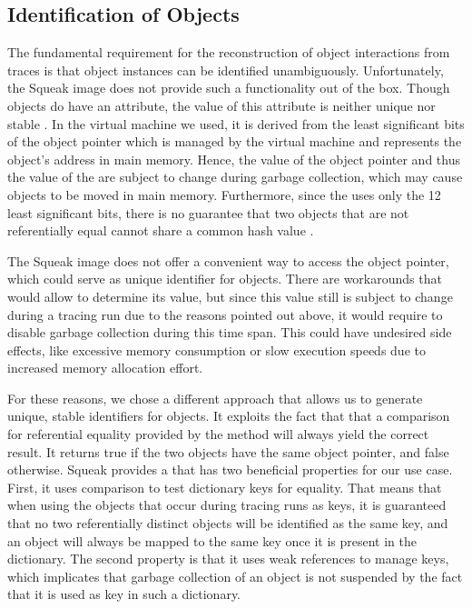 \subsection{Identification of Objects}
\label{ss:ImplementationTracingIdentification}
The fundamental requirement for the reconstruction of object interactions from traces is that object instances can be identified unambiguously.
Unfortunately, the Squeak image does not provide such a functionality out of the box.
Though objects do have an  attribute, the value of this attribute is neither unique nor stable \cite{goldberg_smalltalk-80:_1983}.
In the virtual machine we used, it is derived from the least significant bits of the object pointer which is managed by the virtual machine and represents the object's address in main memory.
Hence, the value of the object pointer and thus the value of the  are subject to change during garbage collection, which may cause objects to be moved in main memory.
Furthermore, since the  uses only the 12 least significant bits, there is no guarantee that two objects that are not referentially equal cannot share a common hash value \cite{goldberg_smalltalk-80:_1983}.

The Squeak image does not offer a convenient way to access the object pointer, which could serve as unique identifier for objects.
There are workarounds that would allow to determine its value, but since this value still is subject to change during a tracing run due to the reasons pointed out above, it would require to disable garbage collection during this time span.
This could have undesired side effects, like excessive memory consumption or slow execution speeds due to increased memory allocation effort.

For these reasons, we chose a different approach that allows us to generate unique, stable identifiers for objects.
It exploits the fact that that a comparison for referential equality provided by the \inlinecode{==} method will always yield the correct result.
It returns true if the two objects have the same object pointer, and false otherwise.
Squeak provides a  that has two beneficial properties for our use case.
First, it uses \inlinecode{==} comparison to test dictionary keys for equality.
That means that when using the objects that occur during tracing runs as keys, it is guaranteed that no two referentially distinct objects will be identified as the same key, and an object will always be mapped to the same key once it is present in the dictionary.
The second property is that it uses weak references to manage keys, which implicates that garbage collection of an object is not suspended by the fact that it is used as key in such a dictionary.

